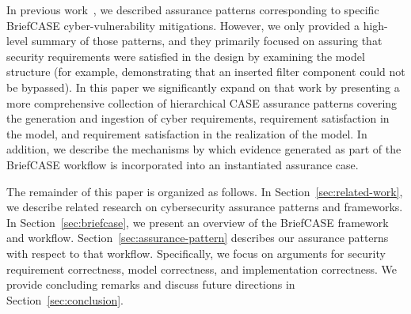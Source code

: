 In previous work~\cite{resolute-destion}, we described assurance patterns corresponding to specific BriefCASE cyber-vulnerability mitigations.  However, we only provided a high-level summary of those patterns, and they primarily focused on assuring that security requirements were satisfied in the design by examining the model structure (for example, demonstrating that an inserted filter component could not be bypassed).
In this paper we significantly expand on that work by presenting a more comprehensive collection of hierarchical CASE assurance patterns covering the generation and ingestion of cyber requirements, requirement satisfaction in the model, and requirement satisfaction in the realization of the model.  In addition, we describe the mechanisms by which evidence generated as part of the BriefCASE workflow is incorporated into an instantiated assurance case.
%
%
%
%
%

The remainder of this paper is organized as follows. In Section~\ref{sec:related-work}, we describe related research on cybersecurity assurance patterns and frameworks. In Section~\ref{sec:briefcase}, we present an overview of the BriefCASE framework and workflow. Section~\ref{sec:assurance-pattern} describes our assurance patterns with respect to that workflow. Specifically, we focus on arguments for security requirement correctness, model correctness, and implementation correctness.  We provide concluding remarks and discuss future directions in Section~\ref{sec:conclusion}.
